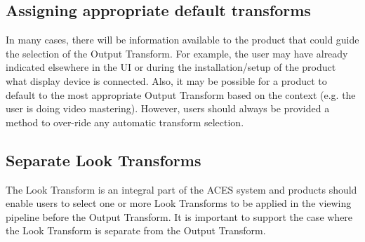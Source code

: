 \subsection{Assigning appropriate default transforms}
In many cases, there will be information available to the product that could guide the selection of the Output Transform. For example, the user may have already indicated elsewhere in the UI or during the installation/setup of the product what display device is connected. Also, it may be possible for a product to default to the most appropriate Output Transform based on the context (e.g. the user is doing video mastering). However, users should always be provided a method to over-ride any automatic transform selection.

\subsection{Separate Look Transforms}
The Look Transform is an integral part of the ACES system and products should enable users to select one or more Look Transforms to be applied in the viewing pipeline before the Output Transform. It is important to support the case where the Look Transform is separate from the Output Transform.